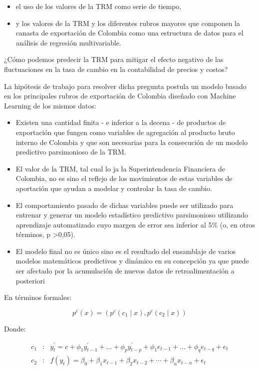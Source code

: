 \begin{itemize}
\item el uso de los valores de la TRM como serie de tiempo,
\item y los valores de la TRM y los diferentes rubros mayores que componen la canasta de exportación de Colombia como una estructura de datos para el análisis de regresión multivariable.
\end{itemize}

¿Cómo podemos predecir la TRM para mitigar el efecto negativo de las fluctuaciones en la tasa de cambio en la contabilidad de precios y costos?

La hipótesis de trabajo para resolver dicha pregunta postula un modelo basado en los principales rubros de exportación de Colombia diseñado con Machine Learning de los mismos datos:
\begin{itemize}
\item Existen una cantidad finita - e inferior a la decena - de productos de exportación que fungen como variables de agregación al producto bruto interno de Colombia y que son necesarias para la consecución de un modelo predictivo parsimonioso de la TRM.
\item El valor de la TRM, tal cual lo ja la Superintendencia Financiera de Colombia, no es sino el reflejo de los movimientos de estas variables de aportación que ayudan a modelar y controlar la tasa de cambio.
\item El comportamiento pasado de dichas variables puede ser utilizado para entrenar y generar un modelo estadístico predictivo parsimonioso utilizando aprendizaje automatizado cuyo margen de error sea inferior al 5\% (o, en otros términos, p \textgreater 0,05).
\item El modelo final no es único sino es el resultado del ensamblaje de varios modelos matemáticos predictivos y dinámico en su concepción ya que puede ser afectado por la acumulación de nuevos datos de retroalimentación a posteriori
\end{itemize}

En términos formales:

\begin{equation}
    p^{c}(x) = (p^{c}(c_{1} \mid x),p^{c}(c_{2} \mid x))
\end{equation}

Donde:

\begin{eqnarray}
    c_{1} & : & y_{t}^{\prime} = c + \phi_{1}y_{t-1}^{\prime} + \ldots + \phi_{p}y_{t-p}^{\prime} + \phi_{1}e_{t-1} + \ldots + \phi_{q}e_{t-q} + e_{t} \\
    c_{2} & : & f(y_{t}) = \beta_{0} + \beta_{1}x_{t-1} + \beta_{2}x_{t-2} + \cdots + \beta_{n}x_{t-n} + \epsilon_{t}
\end{eqnarray}

